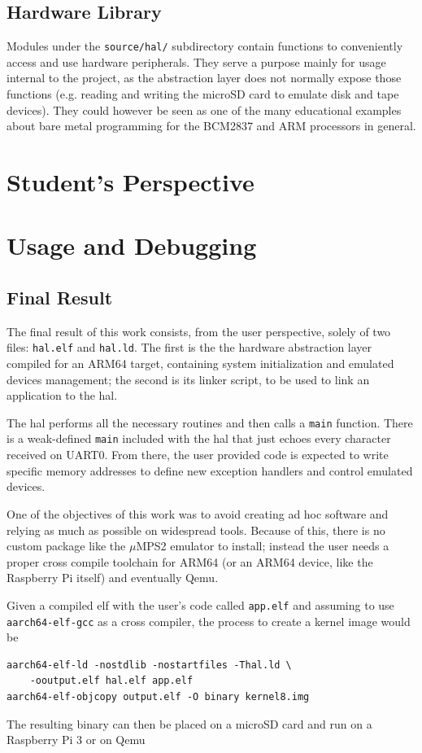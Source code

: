 \documentclass[12pt,a4paper,openright,twoside]{report}
\begin{document}
\section{Hardware Library}
Modules under the {\tt source/hal/} subdirectory contain functions to conveniently access 
and use hardware peripherals. They serve a purpose mainly for usage internal to 
the project, as the abstraction layer does not normally expose those functions
(e.g. reading and writing the microSD card to emulate disk and tape devices).
They could however be seen as one of the many educational examples about 
bare metal programming for the BCM2837 and ARM processors in general.


\clearpage{\pagestyle{empty}\cleardoublepage}
\chapter{Student's Perspective}

\clearpage{\pagestyle{empty}\cleardoublepage}
\chapter{Usage and Debugging}
\section{Final Result}
The final result of this work consists, from the user perspective, solely of 
two files: {\tt hal.elf} and {\tt hal.ld}.
The first is the the hardware abstraction layer compiled for an ARM64 target, 
containing system initialization and emulated devices management; the second is 
its linker script, to be used to link an application to the hal.

The hal performs all the necessary routines and then calls a {\tt main} function.
There is a weak-defined {\tt main} included with the hal that just echoes every
character received on UART0.
From there, the user provided code is expected to write specific memory addresses
to define new exception handlers and control emulated devices. 

One of the objectives of this work was to avoid creating ad hoc software and
relying as much as possible on widespread tools. Because of this, there is no
custom package like the $\mu$MPS2 emulator to install; instead the user needs
a proper cross compile toolchain for ARM64 (or an ARM64 device, like the Raspberry
Pi itself) and eventually Qemu.

Given a compiled elf with the user's code called {\tt app.elf} and assuming to
use {\tt aarch64-elf-gcc} as a cross compiler, the process to create a kernel image
would be 
\begin{lstlisting}
aarch64-elf-ld -nostdlib -nostartfiles -Thal.ld \
    -ooutput.elf hal.elf app.elf                                                                                                                                    
aarch64-elf-objcopy output.elf -O binary kernel8.img
\end{lstlisting}
The resulting binary can then be placed on a microSD card and run on a Raspberry Pi 3
or on Qemu
\end{document}
